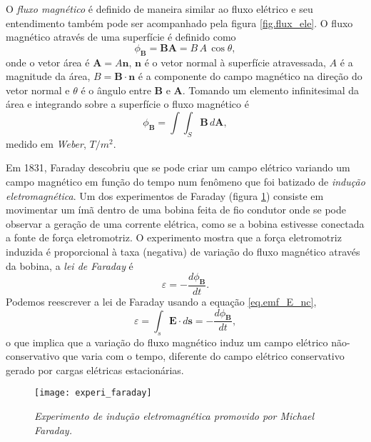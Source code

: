 O \textit{fluxo magnético} é definido de maneira similar ao fluxo elétrico e seu entendimento também pode ser acompanhado pela figura \ref{fig.flux_ele}. O fluxo magnético através de uma superfície é definido como
\begin{equation*}
\phi_\mathbf{B}=\textbf{B}\textbf{A}=B\,A\,\cos\theta,
\end{equation*}
onde o vetor área é $\textbf{A}=A\textbf{n}$, $\textbf{n}$ é o vetor normal à superfície atravessada, $A$ é a magnitude da área, $B=\textbf{B}\cdot\textbf{n}$ é a componente do campo magnético na direção do vetor normal e $\theta$ é o ângulo entre $\textbf{B}$ e $\pmb{A}$. Tomando um elemento infinitesimal da área e integrando sobre a superfície o fluxo magnético é
\begin{equation}\label{eq.fluxo_mag}
\phi_{\mathbf{B}}=\int\int_S\pmb{B}\,d\pmb{A},
\end{equation}
medido em \textit{Weber}, $T/m^2$. 

Em 1831, Faraday descobriu que se pode criar um campo elétrico variando um campo magnético em função do tempo num fenômeno que foi batizado de \textit{indução eletromagnética}. Um dos experimentos de Faraday (figura \ref{fig.exper_faraday}) consiste em movimentar um ímã dentro de uma bobina feita de fio condutor onde se pode observar a geração de uma corrente elétrica, como se a bobina estivesse conectada a fonte de força eletromotriz. O experimento mostra que a força eletromotriz induzida é proporcional à taxa (negativa) de variação do fluxo magnético através da bobina, a \textit{lei de Faraday} é
\begin{equation*}
\varepsilon=-\frac{d\phi_\mathbf{B}}{dt}.
\end{equation*}
Podemos reescrever a lei de Faraday usando a equação \ref{eq.emf_E_nc},
\begin{equation}\label{eq.lei_faraday}
\varepsilon=\int_s\pmb{E}\cdot d\pmb{s}=-\frac{d\phi_\mathbf{B}}{dt},
\end{equation}
o que implica que a variação do fluxo magnético induz um campo elétrico não-conservativo que varia com o tempo, diferente do campo elétrico conservativo gerado por cargas elétricas estacionárias.

\begin{figure}[!htb]
\centering
\texttt{[image: experi\_faraday]}
\caption{\textit{Experimento de indução eletromagnética promovido por Michael Faraday.}}
\label{fig.exper_faraday}
\end{figure}


